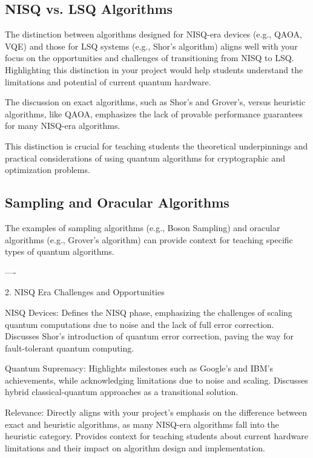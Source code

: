 \subsection{NISQ vs. LSQ Algorithms}

The distinction between algorithms designed for NISQ-era devices (e.g., QAOA, VQE) and those for LSQ systems (e.g., Shor’s algorithm) aligns well with your focus on the opportunities and challenges of transitioning from NISQ to LSQ.
Highlighting this distinction in your project would help students understand the limitations and potential of current quantum hardware.


The discussion on exact algorithms, such as Shor’s and Grover’s, versus heuristic algorithms, like QAOA, emphasizes the lack of provable performance guarantees for many NISQ-era algorithms.

This distinction is crucial for teaching students the theoretical underpinnings and practical considerations of using quantum algorithms for cryptographic and optimization problems.


\subsection{Sampling and Oracular Algorithms}

The examples of sampling algorithms (e.g., Boson Sampling) and oracular algorithms (e.g., Grover’s algorithm) can provide context for teaching specific types of quantum algorithms.


----


2. NISQ Era Challenges and Opportunities

NISQ Devices:
Defines the NISQ phase, emphasizing the challenges of scaling quantum computations due to noise and the lack of full error correction.
Discusses Shor’s introduction of quantum error correction, paving the way for fault-tolerant quantum computing.

Quantum Supremacy:
Highlights milestones such as Google's and IBM's achievements, while acknowledging limitations due to noise and scaling.
Discusses hybrid classical-quantum approaches as a transitional solution.

Relevance:
Directly aligns with your project's emphasis on the difference between exact and heuristic algorithms, as many NISQ-era algorithms fall into the heuristic category.
Provides context for teaching students about current hardware limitations and their impact on algorithm design and implementation.


